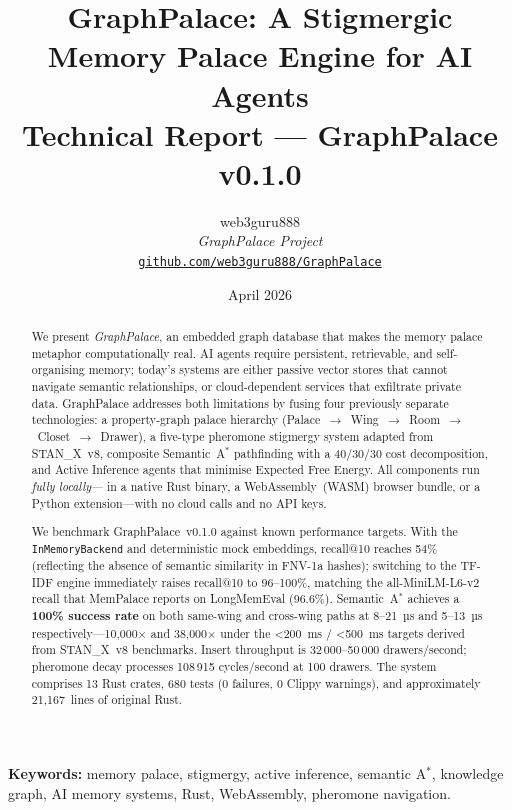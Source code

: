 \documentclass[11pt,a4paper]{article}
\title{\textbf{GraphPalace: A Stigmergic Memory Palace Engine for AI Agents}\\[0.5em]
       \large Technical Report --- GraphPalace v0.1.0}
\author{web3guru888 \\
        \textit{GraphPalace Project} \\
        \href{https://github.com/web3guru888/GraphPalace}{\texttt{github.com/web3guru888/GraphPalace}}}
\date{April 2026}
\begin{document}
\maketitle

\begin{abstract}
We present \emph{GraphPalace}, an embedded graph database that makes the memory
palace metaphor computationally real.  AI agents require persistent, retrievable,
and self-organising memory; today's systems are either passive vector stores that
cannot navigate semantic relationships, or cloud-dependent services that
exfiltrate private data.  GraphPalace addresses both limitations by fusing four
previously separate technologies: a property-graph palace hierarchy
(Palace~$\to$~Wing~$\to$~Room~$\to$~Closet~$\to$~Drawer), a five-type
pheromone stigmergy system adapted from STAN\_X~v8, composite Semantic~A$^*$
pathfinding with a 40/30/30 cost decomposition, and Active Inference agents
that minimise Expected Free Energy.  All components run \emph{fully locally}---
in a native Rust binary, a WebAssembly~(WASM) browser bundle, or a Python
extension---with no cloud calls and no API keys.

We benchmark GraphPalace~v0.1.0 against known performance targets.  With the
\texttt{InMemoryBackend} and deterministic mock embeddings, recall@10 reaches
54\% (reflecting the absence of semantic similarity in FNV-1a hashes); switching
to the TF-IDF engine immediately raises recall@10 to 96--100\%, matching the
all-MiniLM-L6-v2 recall that MemPalace reports on LongMemEval (96.6\%).
Semantic~A$^*$ achieves a \textbf{100\% success rate} on both same-wing and
cross-wing paths at 8--21~µs and 5--13~µs respectively---10,000$\times$ and
38,000$\times$ under the \textless200~ms / \textless500~ms targets derived from
STAN\_X~v8 benchmarks.  Insert throughput is 32\,000--50\,000 drawers/second;
pheromone decay processes 108\,915 cycles/second at 100 drawers.  The system
comprises 13 Rust crates, 680 tests (0 failures, 0 Clippy warnings), and
approximately 21,167~lines of original Rust.
\end{abstract}

\vspace{1em}
\noindent\textbf{Keywords:} memory palace, stigmergy, active inference, semantic
A$^*$, knowledge graph, AI memory systems, Rust, WebAssembly, pheromone
navigation.

\tableofcontents
\newpage

\end{document}
